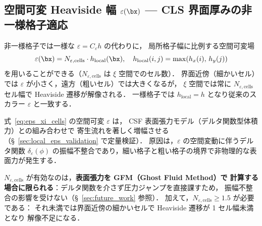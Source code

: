 \subsection{空間可変 Heaviside 幅 \texorpdfstring{$\varepsilon(\bx)$}{epsilon(x)} — CLS 界面厚みの非一様格子適応}
\label{sec:eps_spatial_variable}

非一様格子では一様な $\varepsilon = C_\varepsilon h$ の代わりに，
局所格子幅に比例する空間可変場
\begin{equation}
  \varepsilon(\bx) = N_{\varepsilon,\text{cells}} \cdot h_{\mathrm{local}}(\bx),
  \quad h_{\mathrm{local}}(i,j) = \max(h_x(i),\, h_y(j))
  \label{eq:eps_xi_cells}
\end{equation}
を用いることができる（$N_{\varepsilon,\text{cells}}$ は $\xi$ 空間でのセル数）．
界面近傍（細かいセル）では $\varepsilon$ が小さく，遠方（粗いセル）では大きくなるが，
$\xi$ 空間では常に $N_{\varepsilon,\text{cells}}$ セル幅で Heaviside 遷移が解像される．
一様格子では $h_{\mathrm{local}} = h$ となり従来のスカラー $\varepsilon$ と一致する．

\begin{tcolorbox}[warnbox, title={空間可変 $\varepsilon(\bx)$ と CSF 表面張力の非互換性}]
\label{box:eps_xi_csf_warning}
式~\eqref{eq:eps_xi_cells} の空間可変 $\varepsilon$ は，
CSF 表面張力モデル（デルタ関数型体積力）との組み合わせで
寄生流れを著しく増幅させる（§~\ref{sec:local_eps_validation} で定量検証）．
原因は，$\varepsilon$ の空間変動に伴うデルタ関数 $\delta_\varepsilon(\phi)$
の振幅不整合であり，細い格子と粗い格子の境界で非物理的な表面力が発生する．

$N_{\varepsilon,\text{cells}}$ が有効なのは，\textbf{表面張力を GFM（Ghost Fluid Method）で
計算する場合に限られる}：デルタ関数を介さず圧力ジャンプを直接課すため，
振幅不整合の影響を受けない（§~\ref{sec:future_work} 参照）．
加えて，$N_{\varepsilon,\text{cells}} \ge 1.5$ が必要である：
それ未満では界面近傍の細かいセルで Heaviside 遷移が 1 セル幅未満となり
解像不足になる．
\end{tcolorbox}

